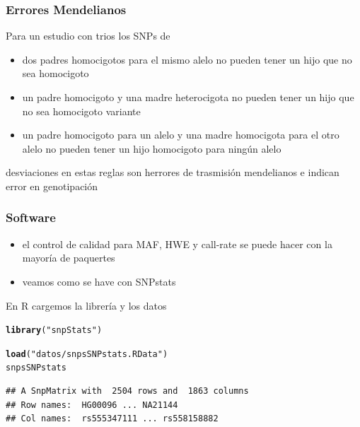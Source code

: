 \documentclass{beamer}\usepackage[]{graphicx}\usepackage[]{color}
\makeatletter
\newcommand{\hlstr}[1]{\textcolor[rgb]{0.192,0.494,0.8}{#1}}%
\newcommand{\hlstd}[1]{\textcolor[rgb]{0.345,0.345,0.345}{#1}}%
\newcommand{\hlkwd}[1]{\textcolor[rgb]{0.737,0.353,0.396}{\textbf{#1}}}%
\newenvironment{kframe}{%
 \def\at@end@of@kframe{}%
 \ifinner\ifhmode%
  \def\at@end@of@kframe{\end{minipage}}%
  \begin{minipage}{\columnwidth}%
 \fi\fi%
 \def\FrameCommand##1{\hskip\@totalleftmargin \hskip-\fboxsep
 \colorbox{shadecolor}{##1}\hskip-\fboxsep
     \hskip-\linewidth \hskip-\@totalleftmargin \hskip\columnwidth}%
 \MakeFramed {\advance\hsize-\width
   \@totalleftmargin\z@ \linewidth\hsize
   \@setminipage}}%
 {\par\unskip\endMakeFramed%
 \at@end@of@kframe}
\newenvironment{knitrout}{}{} %
\makeatother
\begin{document}
\begin{frame}[fragile]
\frametitle{Errores Mendelianos}
Para un estudio con trios los SNPs de 
\begin{itemize}
\item dos padres homocigotos para el mismo alelo no pueden tener un hijo que no sea homocigoto
\item un padre homocigoto y una madre heterocigota no pueden tener un hijo que no sea homocigoto variante
\item un padre homocigoto para un alelo y una madre homocigota para el otro alelo no pueden tener un hijo homocigoto para ning\'un alelo 
\end{itemize}

desviaciones en estas reglas son herrores de trasmisi\'on mendelianos e indican error en genotipaci\'on

\end{frame}



\begin{frame}[fragile]
\frametitle{Software}

\begin{itemize}
\item el control de calidad para MAF, HWE y call-rate se puede hacer con la mayor\'ia de paquertes
\item veamos como se have con SNPstats
\end{itemize}

En R cargemos la librer\'ia y los datos
\begin{knitrout}\footnotesize
{}\color{fgcolor}\begin{kframe}
\begin{alltt}
\hlkwd{library}\hlstd{(}\hlstr{"snpStats"}\hlstd{)}
\end{alltt}


{\ttfamily\noindent\itshape\color{messagecolor}{\#\# Loading required package: survival}}

{\ttfamily\noindent\itshape\color{messagecolor}{\#\# Loading required package: Matrix}}\begin{alltt}
\hlkwd{load}\hlstd{(}\hlstr{"datos/snpsSNPstats.RData"}\hlstd{)}
\hlstd{snpsSNPstats}
\end{alltt}
\begin{verbatim}
## A SnpMatrix with  2504 rows and  1863 columns
## Row names:  HG00096 ... NA21144 
## Col names:  rs555347111 ... rs558158882
\end{verbatim}
\end{kframe}
\end{knitrout}
\end{frame}
\end{document}
